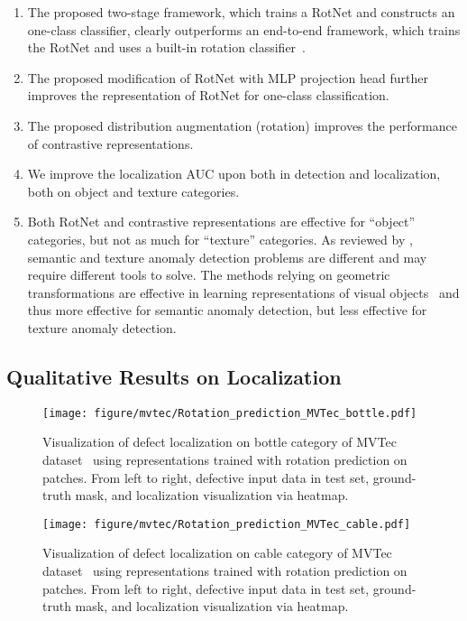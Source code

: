 \documentclass{article} \usepackage{iclr2021_conference,times}
\begin{document}
\begin{enumerate}[leftmargin=0.6cm,itemsep=0pt]
    \item The proposed two-stage framework, which trains a RotNet and constructs an one-class classifier, clearly outperforms an end-to-end framework, which trains the RotNet and uses a built-in rotation classifier~\cite{golan2018deep,hendrycks2019using}.
    \item The proposed modification of RotNet with MLP projection head further improves the representation of RotNet for one-class classification.
    \item The proposed distribution augmentation (rotation) improves the performance of contrastive representations.
    \item We improve the localization AUC upon \cite{venkataramanan2019attention} both in detection and localization, both on object and texture categories.
    \item Both RotNet and contrastive representations are effective for ``object'' categories, but not as much for ``texture'' categories. As reviewed by \cite{ruff2020unifying}, semantic and texture anomaly detection problems are different and may require different tools to solve. The methods relying on geometric transformations are effective in learning representations of visual objects~\cite{gidaris2018unsupervised} and thus more effective for semantic anomaly detection, but less effective for texture anomaly detection.
\end{enumerate}


\subsection{Qualitative Results on Localization}
\label{sec:app_mvtec_localization}

\begin{figure}[ht]
    \centering
    \texttt{[image: figure/mvtec/Rotation\_prediction\_MVTec\_bottle.pdf]}
    \caption{Visualization of defect localization on bottle category of MVTec dataset~\cite{bergmann2019mvtec} using representations trained with rotation prediction on patches. From left to right, defective input data in test set, ground-truth mask, and localization visualization via heatmap.}
    \label{fig:mvtec_bottle}
\end{figure}

\begin{figure}
    \centering
    \texttt{[image: figure/mvtec/Rotation\_prediction\_MVTec\_cable.pdf]}
    \caption{Visualization of defect localization on cable category of MVTec dataset~\cite{bergmann2019mvtec} using representations trained with rotation prediction on patches. From left to right, defective input data in test set, ground-truth mask, and localization visualization via heatmap.}
    \label{fig:mvtec_cable}
\end{figure}
\end{document}
